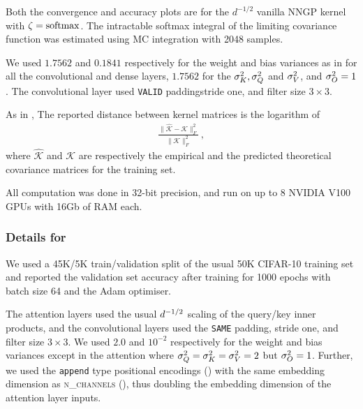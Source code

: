 Both the convergence and accuracy plots are for the $d^{-1/2}$ vanilla NNGP kernel with $\zeta = \text{softmax}$.
The intractable softmax integral of the limiting covariance function was estimated using MC integration with 2048 samples.

We used $1.7562$ and $0.1841$ respectively for the weight and bias variances as in \citep[appendix G.1]{novak2019bayesian} for all the convolutional and dense layers, $1.7562$ for the $\sigma_{K}^2, \sigma_{Q}^2$ and $\sigma_{V}^2$, and $\sigma_{O}^2 = 1$.
The convolutional layer used \texttt{VALID} paddingstride one, and filter size $3 \times 3$.

As in \citep{novak2019bayesian}, The reported distance between kernel matrices is the logarithm of
\begin{align}
    \frac{
        \|
            \hat{\mathcal{K}} - \mathcal{K}
        \|_F^2
    }{
        \|
            \mathcal{K}
        \|_F^2
    }
    \, ,
\end{align}
where $\hat{\mathcal{K}}$ and $\mathcal{K}$ are respectively the empirical and the predicted theoretical covariance matrices for the training set.

All computation was done in 32-bit precision, and run on up to 8 NVIDIA V100 GPUs with 16Gb of RAM each.




\subsubsection{Details for }\label{sect:replacements_appendix}

We used a 45K/5K train/validation split of the usual 50K CIFAR-10 training set and reported the validation set accuracy after training for 1000 epochs with batch size 64 and the Adam optimiser.

The attention layers used the usual $d^{-1/2}$ scaling of the query/key inner products, and the convolutional layers used the \texttt{SAME} padding, stride one, and filter size $3 \times 3$.
We used $2.0$ and $10^{-2}$ respectively for the weight and bias variances except in the attention where $\sigma_{Q}^2 = \sigma_{K}^2 = \sigma_{V}^2 = 2$ but $\sigma_{O}^2 = 1$.
Further, we used the \texttt{append} type positional encodings () with the same embedding dimension as \textsc{n\_channels} (), thus doubling the embedding dimension of the attention layer inputs.


